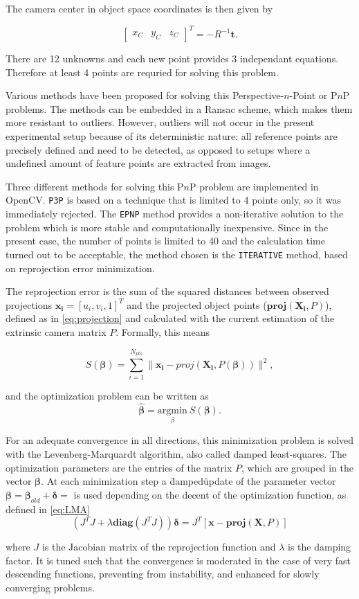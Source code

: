 The camera center in object space coordinates is then given by

\begin{equation}
    \begin{bmatrix} x_C & y_C & z_C \end{bmatrix}^T = -R^{-1} \mathbf{t}.
\end{equation}

There are 12 unknowns and each new point provides 3 independant equations. Therefore at least 4 points are requried for solving this problem.

Various methods have been proposed for solving this Perspective-$n$-Point or P$n$P problems. 
The methods can be embedded in a Ransac scheme, which makes them more resistant to outliers. 
However, outliers will not occur in the present experimental setup because of its deterministic nature: all reference points are precisely defined and need to be detected, as opposed to setups where a undefined amount of feature points are extracted from images.

Three different methods for solving this P$n$P problem are implemented in OpenCV.
\texttt{P3P} is based on a technique that is limited to 4 points only, so it was immediately rejected. The \texttt{EPNP} method \cite{Lepetit2009} provides a non-iterative solution to the problem which is more stable and computationally inexpensive. Since in the present case, the number of points is limited to 40 and the calculation time turned out to be acceptable, the method chosen is the \texttt{ITERATIVE} method, based on reprojection error minimization.

The reprojection error is the sum of the squared distances between observed projections $\mathbf{x_i}=[u_i,v_i,1]^T$ and the projected object points ($\mathbf{proj}(\mathbf{X_i},P)$), defined as in \eqref{eq:projection} and calculated with the current estimation of the extrinsic camera matrix $P$. Formally, this means

\begin{equation}
S(\boldsymbol\beta) = \sum_{i=1}^{N_{pts}} \| \mathbf{x_i}-proj(\mathbf{X_i},P(\boldsymbol\beta)) \| ^2 ,
\end{equation}

and the optimization problem can be written as
\begin{equation}
    \hat{\boldsymbol\beta} = \underset{\beta} {\mathrm{argmin}} ~S(\boldsymbol\beta).
\end{equation}

For an adequate convergence in all directions, this minimization problem is solved with the Levenberg-Marquardt algorithm, also called damped least-squares. The optimization parameters are the entries of the matrix $P$, which are grouped in the vector $\boldsymbol\beta$. At each minimization step a \"damped\" update of the parameter vector $\boldsymbol\beta=\boldsymbol\beta_{old}+\boldsymbol\delta=$ is used depending on the decent of the optimization function, as defined in \eqref{eq:LMA} \cite{LMA}
\begin{equation}
    (J^TJ + \lambda \mathbf{diag}(J^TJ))\boldsymbol\delta = J^T[\mathbf{x}-\mathbf{proj}(\mathbf{X},P)]
\label{eq:LMA}
\end{equation}

where $J$ is the Jacobian matrix of the reprojection function and $\lambda$ is the damping factor. It is tuned such that
the convergence is moderated in the case of very fast descending functions, preventing from instability, and enhanced for slowly converging problems.

